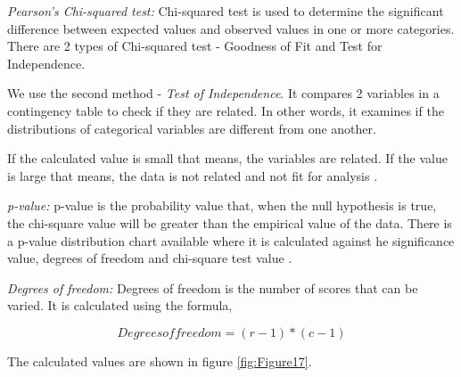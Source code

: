 \documentclass[sigconf]{acmart}
\begin{document}
\textit{Pearson's Chi-squared test:} Chi-squared test is used to determine the significant difference between expected values and observed values in one or more categories. There are 2 types of Chi-squared test - Goodness of Fit and Test for Independence. 

We use the second method - \emph{Test of Independence}. It compares 2 variables in a contingency table to check if they are related. In other words, it examines if the distributions of categorical variables are different from one another. 


If the calculated value is small that means, the variables are related. If the value is large that means, the data is not related and not fit for analysis \cite{chi-square}.

\textit{p-value:} p-value is the probability value that, when the null hypothesis is true, the chi-square value will be greater than the empirical value of the data. There is a p-value distribution chart available where it is calculated against he significance value, degrees of freedom and chi-square test value \cite{p-value}.

\textit{Degrees of freedom:} Degrees of freedom is the number of scores that can be varied. It is calculated using the formula,

\begin{equation}
Degrees of freedom = (r-1)*(c-1)
\end{equation}

The calculated values are shown in figure \ref{fig:Figure17}.
\end{document}
